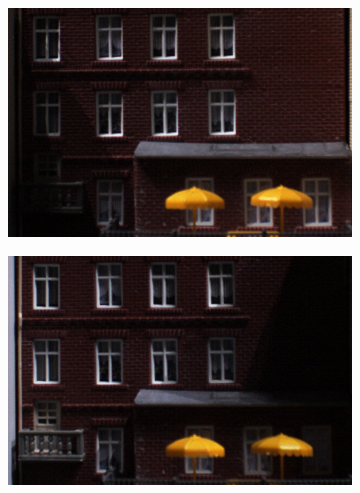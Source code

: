 \documentclass[thesis.tex]{subfiles}
\begin{document}
\begin{figure}[H]
\begin{subfigure}[t]{0.49\textwidth}
        \caption{}
        \label{fig:cellLayoutConcentricPolarCenter}
    \end{subfigure}
    \caption{}
\end{figure}
%
\begin{figure}[H]
    \centering
    \begin{subfigure}[t]{0.49\textwidth}
        \includegraphics[width=\textwidth]{img/pixelNormalizationExample1.png}
        \caption{}
        \label{fig:pixelNormalizationExample1}
    \end{subfigure}
    \begin{subfigure}[t]{0.49\textwidth}
        \includegraphics[width=\textwidth]{img/pixelNormalizationExample2.png}
        \caption{}
        \label{fig:pixelNormalizationExample2}
    \end{subfigure}
    \begin{subfigure}[t]{0.49\textwidth}

\end{subfigure}
\end{figure}
\end{document}
